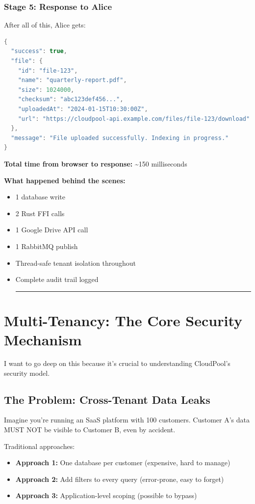 \documentclass[11pt,a4paper]{report}
\begin{document}
\subsection{Stage 5: Response to Alice}


After all of this, Alice gets:

\begin{lstlisting}[language=Java]
{
  "success": true,
  "file": {
    "id": "file-123",
    "name": "quarterly-report.pdf",
    "size": 1024000,
    "checksum": "abc123def456...",
    "uploadedAt": "2024-01-15T10:30:00Z",
    "url": "https://cloudpool-api.example.com/files/file-123/download"
  },
  "message": "File uploaded successfully. Indexing in progress."
}
\end{lstlisting}

\textbf{Total time from browser to response:} {\textasciitilde}150 milliseconds

\textbf{What happened behind the scenes:}
\begin{itemize}
\item 1 database write
\item 2 Rust FFI calls
\item 1 Google Drive API call
\item 1 RabbitMQ publish
\item Thread-safe tenant isolation throughout
\item Complete audit trail logged


\vfill\hrule\vfill


\end{itemize}

\chapter{Multi-Tenancy: The Core Security Mechanism}


I want to go deep on this because it's crucial to understanding CloudPool's security model.


\section{The Problem: Cross-Tenant Data Leaks}


Imagine you're running an SaaS platform with 100 customers. Customer A's data MUST NOT be visible to Customer B, even by accident.

Traditional approaches:
\begin{itemize}
\item \textbf{Approach 1:} One database per customer (expensive, hard to manage)
\item \textbf{Approach 2:} Add filters to every query (error-prone, easy to forget)
\item \textbf{Approach 3:} Application-level scoping (possible to bypass)

\end{itemize}
\end{document}
